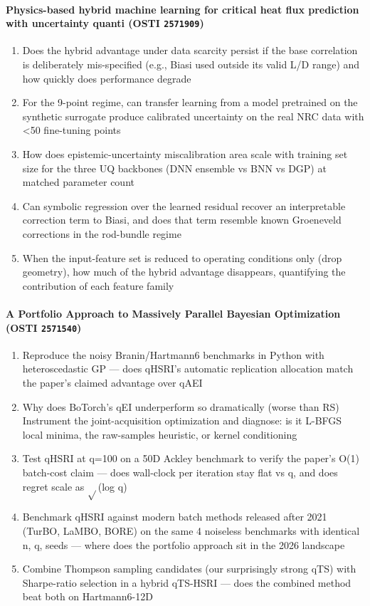 \paragraph{Physics-based hybrid machine learning for critical heat flux prediction with uncertainty quanti \textnormal{\small(OSTI \texttt{2571909})}}
\begin{enumerate}[leftmargin=1.6em,itemsep=0.2em,topsep=0.2em,label=Q\arabic*.]
\item Does the hybrid advantage under data scarcity persist if the base correlation is deliberately mis-specified (e.g., Biasi used outside its valid L/D range) and how quickly does performance degrade
\item For the 9-point regime, can transfer learning from a model pretrained on the synthetic surrogate produce calibrated uncertainty on the real NRC data with \textless{}50 fine-tuning points
\item How does epistemic-uncertainty miscalibration area scale with training set size for the three UQ backbones (DNN ensemble vs BNN vs DGP) at matched parameter count
\item Can symbolic regression over the learned residual recover an interpretable correction term to Biasi, and does that term resemble known Groeneveld corrections in the rod-bundle regime
\item When the input-feature set is reduced to operating conditions only (drop geometry), how much of the hybrid advantage disappears, quantifying the contribution of each feature family
\end{enumerate}
\paragraph{A Portfolio Approach to Massively Parallel Bayesian Optimization \textnormal{\small(OSTI \texttt{2571540})}}
\begin{enumerate}[leftmargin=1.6em,itemsep=0.2em,topsep=0.2em,label=Q\arabic*.]
\item Reproduce the noisy Branin/Hartmann6 benchmarks in Python with heteroscedastic GP --- does qHSRI's automatic replication allocation match the paper's claimed advantage over qAEI
\item Why does BoTorch's qEI underperform so dramatically (worse than RS) Instrument the joint-acquisition optimization and diagnose: is it L-BFGS local minima, the raw-samples heuristic, or kernel conditioning
\item Test qHSRI at q=100 on a 50D Ackley benchmark to verify the paper's O(1) batch-cost claim --- does wall-clock per iteration stay flat vs q, and does regret scale as $\sqrt{}$(log q)
\item Benchmark qHSRI against modern batch methods released after 2021 (TurBO, LaMBO, BORE) on the same 4 noiseless benchmarks with identical n, q, seeds --- where does the portfolio approach sit in the 2026 landscape
\item Combine Thompson sampling candidates (our surprisingly strong qTS) with Sharpe-ratio selection in a hybrid qTS-HSRI --- does the combined method beat both on Hartmann6-12D
\end{enumerate}
